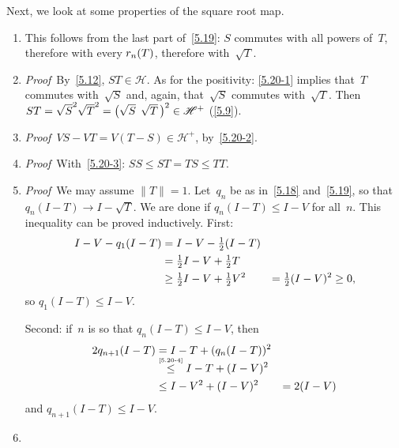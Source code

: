 \documentclass[main.tex]{subfiles}
\begin{document}
\begin{psec}{5.20}%
Next,
we look at some properties of the square root map.
\begin{enumerate}
\item \label{5.20-1} 
This follows from the last part of~\ref{5.19}:
$S$ commutes with all powers of~$T$,
therefore with every $r_n(T)$,
therefore with~$\sqrt{T}$.
%
\item \label{5.20-2} 

\noindent \emph{Proof}\  By~\ref{5.12}, $ST\in{\mathscr H}$.
As for the positivity: 
\ref{5.20-1} implies that~$T$ commutes with~$\sqrt{S}$
and, again, that~$\sqrt{S}$ commutes with~$\sqrt{T}$.
Then $ST=\smash{\sqrt{S}^2} \smash{\sqrt{T}^2}
= \smash{\bigl(\sqrt{S}^{\phantom{2}}\sqrt{T}\,\bigr)^2}\in{\mathscr H}^+$
\quad(\ref{5.9}). \xqed
%
\item \label{5.20-3} 

\noindent \emph{Proof}\  $VS-VT=V(T-S)\in{\mathscr H}^+$,
by~\ref{5.20-2}. \xqed
%
\item \label{5.20-4} 

\noindent \emph{Proof}\ With~\ref{5.20-3}:
$SS\leq ST=TS\leq TT$. \xqed
%
\item \label{5.20-5} 

\noindent\emph{Proof}\  We may assume $\|T\|=1$.
Let~$q_n$ be as in~\ref{5.18} and~\ref{5.19},
so that $q_n(I-T)\rightarrow I-\sqrt{T}$.
We are done if $q_n(I-T)\leq I-V$ for all~$n$.
This inequality can be proved inductively.
First: 
\begin{alignat*}{2}
I-V-q_1(I-T) 
& = I-V-{\textstyle \frac{1}{2}}(I-T)  & \\
& = {\textstyle \frac{1}{2}} I - V + {\textstyle \frac{1}{2}} T & \\
& \geq {\textstyle \frac{1}{2}} I - V + {\textstyle \frac{1}{2}} V^2
 &= {\textstyle \frac{1}{2}} (I-V)^2 \geq 0\htam{,}
\end{alignat*}
so $q_1(I-T)\leq I-V$.

Second:  if~$n$ is so that $q_n(I-T)\leq I-V$, then
\begin{alignat*}{2}
2q_{n+1} (I-T) 
& = I-T+(q_n(I-T))^2 & \\
& \relref{\leq}{5.20-4} I-T+(I-V)^2 & \\
& \leq I-V^2+(I-V)^2 & = 2(I-V)
\end{alignat*}
and $q_{n+1} (I-T) \leq I-V$. \xqed
%
\item \label{5.20-6} 


\end{enumerate}
\end{psec}
\end{document}
